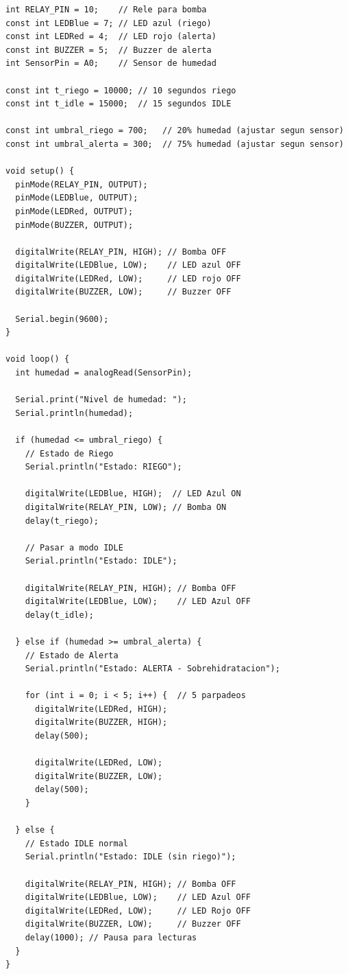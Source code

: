 \begin{lstlisting}[style=cppstyle, caption={Código en C++ para sistema de riego inteligente con relé.}, label={code:riego_inteligente}]
int RELAY_PIN = 10;    // Rele para bomba
const int LEDBlue = 7; // LED azul (riego)
const int LEDRed = 4;  // LED rojo (alerta)
const int BUZZER = 5;  // Buzzer de alerta
int SensorPin = A0;    // Sensor de humedad

const int t_riego = 10000; // 10 segundos riego
const int t_idle = 15000;  // 15 segundos IDLE

const int umbral_riego = 700;   // 20% humedad (ajustar segun sensor)
const int umbral_alerta = 300;  // 75% humedad (ajustar segun sensor)

void setup() {
  pinMode(RELAY_PIN, OUTPUT);
  pinMode(LEDBlue, OUTPUT);
  pinMode(LEDRed, OUTPUT);
  pinMode(BUZZER, OUTPUT);

  digitalWrite(RELAY_PIN, HIGH); // Bomba OFF
  digitalWrite(LEDBlue, LOW);    // LED azul OFF
  digitalWrite(LEDRed, LOW);     // LED rojo OFF
  digitalWrite(BUZZER, LOW);     // Buzzer OFF

  Serial.begin(9600);
}

void loop() {
  int humedad = analogRead(SensorPin);

  Serial.print("Nivel de humedad: ");
  Serial.println(humedad);

  if (humedad <= umbral_riego) {
    // Estado de Riego
    Serial.println("Estado: RIEGO");

    digitalWrite(LEDBlue, HIGH);  // LED Azul ON
    digitalWrite(RELAY_PIN, LOW); // Bomba ON
    delay(t_riego);

    // Pasar a modo IDLE
    Serial.println("Estado: IDLE");

    digitalWrite(RELAY_PIN, HIGH); // Bomba OFF
    digitalWrite(LEDBlue, LOW);    // LED Azul OFF
    delay(t_idle);

  } else if (humedad >= umbral_alerta) {
    // Estado de Alerta
    Serial.println("Estado: ALERTA - Sobrehidratacion");

    for (int i = 0; i < 5; i++) {  // 5 parpadeos
      digitalWrite(LEDRed, HIGH);
      digitalWrite(BUZZER, HIGH);
      delay(500);

      digitalWrite(LEDRed, LOW);
      digitalWrite(BUZZER, LOW);
      delay(500);
    }

  } else {
    // Estado IDLE normal
    Serial.println("Estado: IDLE (sin riego)");

    digitalWrite(RELAY_PIN, HIGH); // Bomba OFF
    digitalWrite(LEDBlue, LOW);    // LED Azul OFF
    digitalWrite(LEDRed, LOW);     // LED Rojo OFF
    digitalWrite(BUZZER, LOW);     // Buzzer OFF
    delay(1000); // Pausa para lecturas
  }
}
\end{lstlisting}

